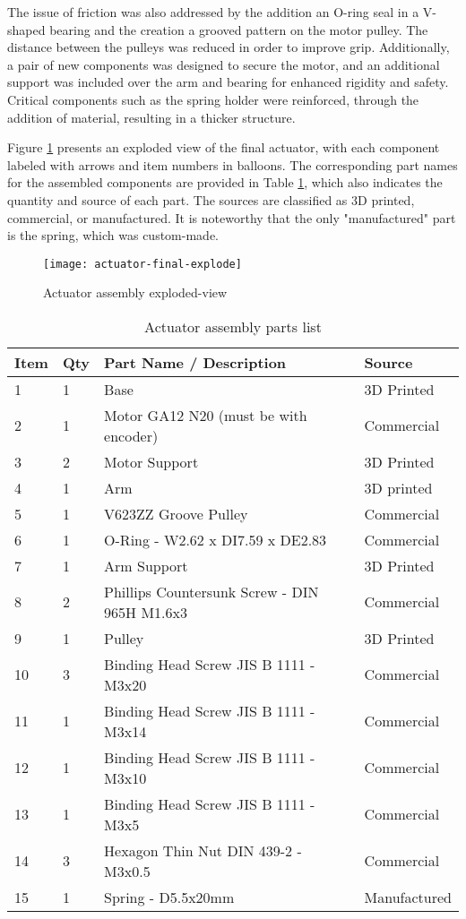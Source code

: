 The issue of friction was also addressed by the addition an O-ring seal in a V-shaped bearing and the creation a grooved pattern on the motor pulley. The distance between the pulleys was reduced in order to improve grip. Additionally, a pair of new components was designed to secure the motor, and an additional support was included over the arm and bearing for enhanced rigidity and safety. Critical components such as the spring holder were reinforced, through the addition of material, resulting in a thicker structure.

Figure \ref{fig:final-actuator-explode} presents an exploded view of the final actuator, with each component labeled with arrows and item numbers in balloons. The corresponding part names for the assembled components are provided in Table \ref{tab:final-actuator-parts}, which also indicates the quantity and source of each part. The sources are classified as 3D printed, commercial, or manufactured. It is noteworthy that the only "manufactured" part is the spring, which was custom-made.

\begin{figure}[H]
    \centering
    \texttt{[image: actuator-final-explode]}
    \caption{Actuator assembly exploded-view}
    \label{fig:final-actuator-explode}
\end{figure}
\begin{table}[H]
    \centering
    \caption{Actuator assembly parts list}
    \label{tab:final-actuator-parts}
    \begin{tabular}{llll}
    \toprule
    Item & Qty & Part Name / Description & Source \\
    \midrule
    1 & 1 & Base & 3D Printed \\
    2 & 1 & Motor GA12 N20 (must be with encoder) & Commercial \\
    3 & 2 & Motor Support & 3D Printed \\
    4 & 1 & Arm & 3D printed \\
    5 & 1 & V623ZZ Groove Pulley & Commercial \\
    6 & 1 & O-Ring - W2.62 x DI7.59 x DE2.83 & Commercial \\
    7 & 1 & Arm Support & 3D Printed \\
    8 & 2 & Phillips Countersunk Screw - DIN 965H M1.6x3 & Commercial \\
    9 & 1 & Pulley & 3D Printed \\
    10 & 3 & Binding Head Screw JIS B 1111 - M3x20 & Commercial \\
    11 & 1 & Binding Head Screw JIS B 1111 - M3x14 & Commercial \\
    12 & 1 & Binding Head Screw JIS B 1111 - M3x10 & Commercial \\
    13 & 1 & Binding Head Screw JIS B 1111 - M3x5 & Commercial \\
    14 & 3 & Hexagon Thin Nut DIN 439-2 - M3x0.5 & Commercial \\
    15 & 1 & Spring - D5.5x20mm & Manufactured \\
    \bottomrule
    \end{tabular}
\end{table}


